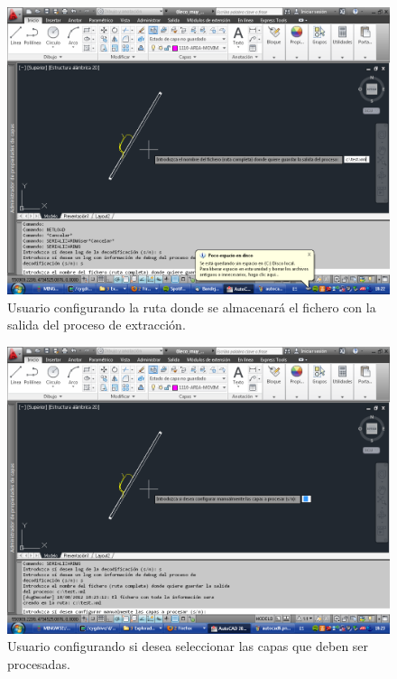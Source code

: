 \begin{figure}[h]
\begin{center}
\includegraphics[width=\textwidth]{imgs/autocad8}
\caption{Usuario configurando la ruta donde se almacenará el fichero con la salida del proceso de extracción.}
\end{center}
\end{figure}

\begin{figure}[h]
\begin{center}
\includegraphics[width=\textwidth]{imgs/autocad9}
\caption{Usuario configurando si desea seleccionar las capas que deben ser procesadas.}
\end{center}
\end{figure}

